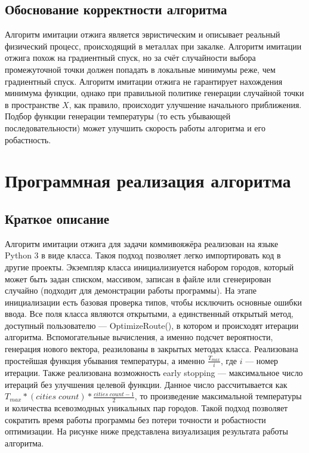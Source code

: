 \documentclass[14pt,a4paper]{scrartcl}
\begin{document}
	\subsection{Обоснование корректности алгоритма}
	\begin{flushleft}
		Алгоритм имитации отжига является эвристическим и описывает реальный физический процесс, происходящий в металлах при закалке. Алгоритм имитации отжига похож на градиентный спуск, но за счёт случайности выбора промежуточной точки должен попадать в локальные минимумы реже, чем градиентный спуск. Алгоритм имитации отжига не гарантирует нахождения минимума функции, однако при правильной политике генерации случайной точки в пространстве $X$, как правило, происходит улучшение начального приближения. Подбор функции генерации температуры (то есть убывающей последовательности) может улучшить скорость работы алгоритма и его робастность.
	\end{flushleft}
	\section{Программная реализация алгоритма}
	\subsection{Краткое описание}
	\begin{flushleft}
		Алгоритм имитации отжига для задачи коммивояжёра реализован на языке Python 3 в виде класса. Такоя подход позволяет легко импортировать код в другие проекты. Экземпляр класса инициализиуется набором городов, который может быть задан списком, массивом, записан в файле или сгенерирован случайно (подходит для демонстрации работы программы). На этапе инициализации есть базовая проверка типов, чтобы исключить основные ошибки ввода. Все поля класса являются открытыми, а единственный открытый метод, доступный пользователю --- OptimizeRoute(), в котором и происходят итерации алгоритма. Вспомогательные вычисления, а именно подсчет вероятности, генерация нового вектора, реазилованы в закрытых методах класса. Реализована простейшая функция убывания температуры, а именно $\frac{T_{max}}{i}$, где $i$ --- номер итерации. Также реализована возможность early stopping --- максимальное число итераций без улучшения целевой функции. Данное число рассчитывается как $T_{max}*(cities \; count)*\frac{cities \; count - 1}{2}$, то произведение максимальной температуры и количества всевозмодных уникальных пар городов. Такой подход позволяет сократить время работы программы без потери точности и робастности оптимизации. На рисунке ниже представлена визуализация результата работы алгоритма.
	\end{flushleft}
\end{document}
